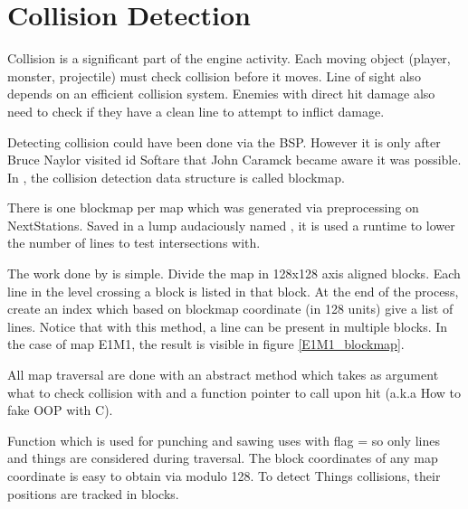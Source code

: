 \section{Collision Detection} \label{blockmapdetails}
Collision is a significant part of the engine activity. Each moving object (player, monster, projectile) must check collision before it moves. Line of sight also depends on an efficient collision system. Enemies with direct hit damage also need to check if they have a clean line to attempt to inflict damage.\\
\par
Detecting collision could have been done via the BSP. However it is only after Bruce Naylor visited id Softare that John Caramck became aware it was possible. In \doom, the collision detection data structure is called blockmap.\\
\par
{}
\par
There is one blockmap per map which was generated via  preprocessing on NextStations. Saved in a lump audaciously named , it is used a runtime to lower the number of lines to test intersections with.\\
\par
The work done by  is simple. Divide the map in 128x128 axis aligned blocks. Each line in the level crossing a block is listed in that block. At the end of the process, create an index which based on blockmap coordinate (in 128 units) give a list of lines. Notice that with this method, a line can be present in multiple blocks. In the case of map E1M1, the result is visible in figure \ref{E1M1_blockmap}.


All map traversal are done with an abstract method  which takes as argument what to check collision with and a function pointer to call upon hit (a.k.a How to fake OOP with C).\\
\par
{}
\par
Function  which is used for punching and sawing uses  with flag =  so only lines and things are considered during traversal. The block coordinates of any map coordinate is easy to obtain via modulo 128. To detect Things collisions, their positions are tracked in blocks.\\
\par
{}